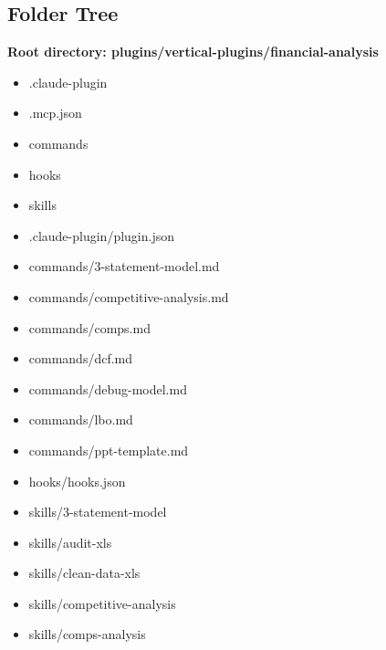 \documentclass[11pt]{article}
\begin{document}
\subsection{Folder Tree}
\textbf{Root directory: plugins/vertical-plugins/financial-analysis}
\begin{itemize}[leftmargin=*,itemsep=1pt,topsep=2pt]
\item \hspace*{0.0em}.claude-plugin
\item \hspace*{0.0em}.mcp.json
\item \hspace*{0.0em}commands
\item \hspace*{0.0em}hooks
\item \hspace*{0.0em}skills
\item \hspace*{0.9em}.claude-plugin/plugin.json
\item \hspace*{0.9em}commands/3-statement-model.md
\item \hspace*{0.9em}commands/competitive-analysis.md
\item \hspace*{0.9em}commands/comps.md
\item \hspace*{0.9em}commands/dcf.md
\item \hspace*{0.9em}commands/debug-model.md
\item \hspace*{0.9em}commands/lbo.md
\item \hspace*{0.9em}commands/ppt-template.md
\item \hspace*{0.9em}hooks/hooks.json
\item \hspace*{0.9em}skills/3-statement-model
\item \hspace*{0.9em}skills/audit-xls
\item \hspace*{0.9em}skills/clean-data-xls
\item \hspace*{0.9em}skills/competitive-analysis
\item \hspace*{0.9em}skills/comps-analysis

\end{itemize}
\end{document}
